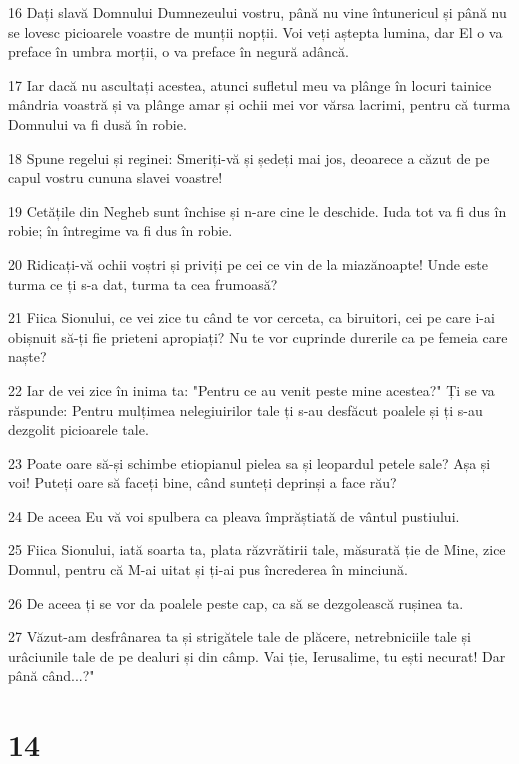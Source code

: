\par 16 Dați slavă Domnului Dumnezeului vostru, până nu vine întunericul și până nu se lovesc picioarele voastre de munții nopții. Voi veți aștepta lumina, dar El o va preface în umbra morții, o va preface în negură adâncă.
\par 17 Iar dacă nu ascultați acestea, atunci sufletul meu va plânge în locuri tainice mândria voastră și va plânge amar și ochii mei vor vărsa lacrimi, pentru că turma Domnului va fi dusă în robie.
\par 18 Spune regelui și reginei: Smeriți-vă și ședeți mai jos, deoarece a căzut de pe capul vostru cununa slavei voastre!
\par 19 Cetățile din Negheb sunt închise și n-are cine le deschide. Iuda tot va fi dus în robie; în întregime va fi dus în robie.
\par 20 Ridicați-vă ochii voștri și priviți pe cei ce vin de la miazănoapte! Unde este turma ce ți s-a dat, turma ta cea frumoasă?
\par 21 Fiica Sionului, ce vei zice tu când te vor cerceta, ca biruitori, cei pe care i-ai obișnuit să-ți fie prieteni apropiați? Nu te vor cuprinde durerile ca pe femeia care naște?
\par 22 Iar de vei zice în inima ta: "Pentru ce au venit peste mine acestea?" Ți se va răspunde: Pentru mulțimea nelegiuirilor tale ți s-au desfăcut poalele și ți s-au dezgolit picioarele tale.
\par 23 Poate oare să-și schimbe etiopianul pielea sa și leopardul petele sale? Așa și voi! Puteți oare să faceți bine, când sunteți deprinși a face rău?
\par 24 De aceea Eu vă voi spulbera ca pleava împrăștiată de vântul pustiului.
\par 25 Fiica Sionului, iată soarta ta, plata răzvrătirii tale, măsurată ție de Mine, zice Domnul, pentru că M-ai uitat și ți-ai pus încrederea în minciună.
\par 26 De aceea ți se vor da poalele peste cap, ca să se dezgolească rușinea ta.
\par 27 Văzut-am desfrânarea ta și strigătele tale de plăcere, netrebniciile tale și urâciunile tale de pe dealuri și din câmp. Vai ție, Ierusalime, tu ești necurat! Dar până când...?"

\chapter{14}

